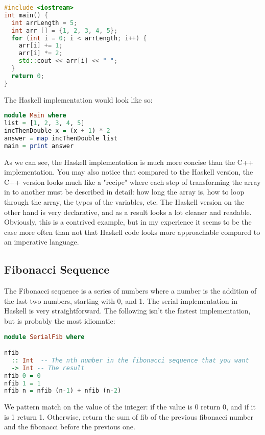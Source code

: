 \documentclass[a4paper, 10pt]{article}
\begin{document}
\begin{lstlisting}[language=C++, caption=C++ example]
#include <iostream>
int main() {
  int arrLength = 5;
  int arr [] = {1, 2, 3, 4, 5};
  for (int i = 0; i < arrLength; i++) {
    arr[i] += 1;
    arr[i] *= 2;
    std::cout << arr[i] << " ";
  }
  return 0;
}
\end{lstlisting}

The Haskell implementation would look like so:

\begin{lstlisting}[language=Haskell, caption=Haskell example]
module Main where
list = [1, 2, 3, 4, 5]
incThenDouble x = (x + 1) * 2
answer = map incThenDouble list
main = print answer
\end{lstlisting}

As we can see, the Haskell implementation is much more concise than the C++ implementation. You may also notice that compared to the Haskell version, the C++ version looks much like a "recipe" where each step of transforming the array in to another must be described in detail: how long the array is, how to loop through the array, the types of the variables, etc. The Haskell version on the other hand is very declarative, and as a result looks a lot cleaner and readable. Obviously, this is a contrived example, but in my experience it seems to be the case more often than not that Haskell code looks more approachable compared to an imperative language.

\subsection{Fibonacci Sequence}
The Fibonacci sequence is a series of numbers where a number is the addition of the last two numbers, starting with 0, and 1. The serial implementation in Haskell is very straightforward. The following isn't the fastest implementation, but is probably the most idiomatic:

\begin{lstlisting}[language=Haskell, caption=Haskell Fibonacci]
module SerialFib where

nfib
  :: Int  -- The nth number in the fibonacci sequence that you want
  -> Int -- The result
nfib 0 = 0
nfib 1 = 1
nfib n = nfib (n-1) + nfib (n-2)
\end{lstlisting}

We pattern match on the value of the integer: if the value is 0 return 0, and if it is 1 return 1. Otherwise, return the sum of fib of the previous fibonacci number and the fibonacci before the previous one. 
\end{document}

